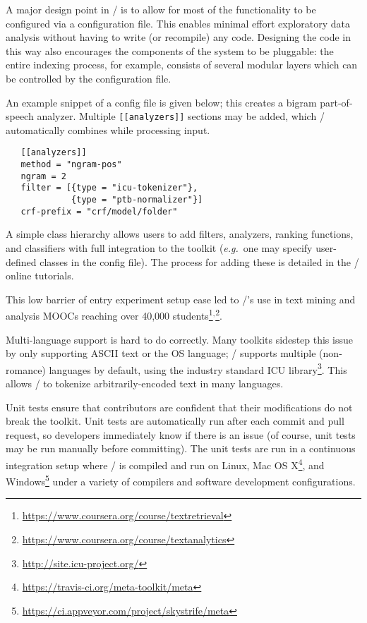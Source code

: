A major design point in \meta/ is to allow for most of the functionality to be
configured via a configuration file. This enables minimal effort exploratory
data analysis without having to write (or recompile) any code. Designing the
code in this way also encourages the components of the system to be pluggable:
the entire indexing process, for example, consists of several modular layers
which can be controlled by the configuration file.

An example snippet of a config file is given below; this creates a bigram
part-of-speech analyzer. Multiple \texttt{[[analyzers]]} sections may be added,
which \meta/ automatically combines while processing input.

{\small
\begin{verbatim}
   [[analyzers]]
   method = "ngram-pos"
   ngram = 2
   filter = [{type = "icu-tokenizer"},
             {type = "ptb-normalizer"}]
   crf-prefix = "crf/model/folder"
\end{verbatim}}

A simple class hierarchy allows users to add filters, analyzers, ranking
functions, and classifiers with full integration to the toolkit
(\emph{e.g.}\ one
may specify user-defined classes in the config file). The process for adding
these is detailed in the \meta/ online tutorials.

This low barrier of entry experiment setup ease led to \meta/'s use in text
mining and analysis MOOCs reaching over 40,000
students\footnote{\url{https://www.coursera.org/course/textretrieval}}$^,$\footnote{\url{https://www.coursera.org/course/textanalytics}}.

Multi-language support is hard to do correctly. Many toolkits sidestep this
issue by only supporting ASCII text or the OS language; \meta/ supports multiple
(non-romance) languages by default, using the industry standard ICU
library\footnote{\url{http://site.icu-project.org/}}. This allows \meta/ to
tokenize arbitrarily-encoded text in many languages.

Unit tests ensure that contributors are confident that their modifications do
not break the toolkit. Unit tests are automatically run after each commit and
pull request, so developers immediately know if there is an issue (of course,
unit tests may be run manually before committing). The unit tests are run in a
continuous integration setup where \meta/ is compiled and run on Linux, Mac OS
X\footnote{\url{https://travis-ci.org/meta-toolkit/meta}}, and
Windows\footnote{\url{https://ci.appveyor.com/project/skystrife/meta}} under a
variety of compilers and software development configurations.
